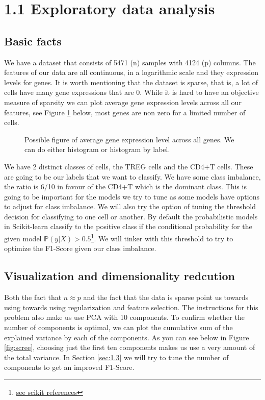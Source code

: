 \documentclass{article}
\begin{document}
\section{1.1 Exploratory data analysis}

\subsection{Basic facts}
We have a dataset that consists of 5471 (n) samples with 4124 (p) columns. The features of our data are all continuous, in a logarithmic scale and they expression levels 
for genes. It is worth mentioning that the dataset is sparse, that is, a lot of cells have many gene expressions that are 0. While it is hard to have an objective measure
of sparsity we can plot average gene expression levels across all our features, see Figure \ref{fig:hist_sparse} below, most genes are non zero for a limited number of cells.

\begin{figure}[h]

    
    \caption{Possible figure of average gene expression level across all genes. We can do either histogram or histogram by label.}\label{fig:hist_sparse}
\end{figure}


We have 2 distinct classes of cells, the TREG cells and the 
CD4+T cells. These are going to be our labels that we want to classify. We have some class imbalance, the ratio is 6/10 in favour of the CD4+T 
which is the dominant class. This is going to be important for the models we try to tune as some models have options to adjust for class imbalance.
We will also try the option of tuning the threshold decision for classifying to one cell or another. By default the probabilistic models in Scikit-learn
classify to the positive class if the conditional probability for the given model $\mathbb{P}(\textit{y}|X) > 0.5$\footnote{\href{https://scikit-learn.org/1.5/modules/classification_threshold.html}{see scikit references}}. 
We will tinker with this threshold to try to optimize the F1-Score given our class imbalance.  

\subsection{Visualization and dimensionality redcution}

Both the fact that $n \approx p$ and the fact that the data is sparse point us towards using towards using regularization and feature selection.
The instructions for this problem also make us use PCA with 10 components. To confirm whether the number of components is optimal, we can plot the cumulative sum of the explained variance by each of the components.
As you can see below in Figure \ref{fig:scree}, choosing just the first ten components makes us use a very amount of the total variance.
In Section \ref{sec:1.3} we will try to tune the number of components to get an improved F1-Score.
\end{document}
